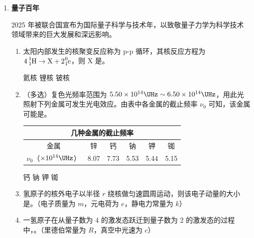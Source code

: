 \documentclass[\gkver]{gaokaozhenti}
\begin{document}
\begin{enumerate}
{2．根据偏振原理，偏振片 B 每转过半周透光强度从最小到最大、再到最小，可知光屏上两个光强最小的时间间隔为 $0.5T$，故选 C。

3．若从 c 侧观察，插入 c 时，应遮住 a、b；插入 d 时，应遮住 c 以及 a、b 的像；

该玻璃的折射率为 $n=\frac{\sin\theta_{1}}{\sin\theta_{2}}$。
}

\item
\textbf{量子百年}

2025 年被联合国宣布为国际量子科学与技术年，以致敬量子力学为科学技术领域带来的巨大发展和深远影响。
\begin{enumerate}
	\item
	太阳内部发生的核聚变反应称为 p-p 循环，其核反应方程为 $\ce{4^{1}_{1}H} \to \ce{X} + 2\ce{^{0}_{1}e}$，则 X 是。

	{氦核}
	{锂核}
	{铍核}

	\item
	（多选）复色光频率范围为 $5.50\times10^{14} \UHz \sim 6.50\times10^{14} \UHz$，用此光照射下列金属可发生光电效应。由表中各金属的截止频率 $\nu_{0}$ 可知，该金属可能是。

	\begin{center}
\begin{tabular}{|c|c|c|c|c|c|}
\hline
\multicolumn{6}{|c|}{几种金属的截止频率} \\ \hline
金属 & 锌 & 钙 & 钠 & 钾 & 铷 \\ \hline
$\nu_{0}$（$\times10^{14} \UHz$） & 8.07 & 7.73 & 5.53 & 5.44 & 5.15 \\ \hline
\end{tabular}
\end{center}

	{钙}
	{钠}
	{钾}
	{铷}

	\item
	氢原子的核外电子以半径 $r$ 绕核做匀速圆周运动，则该电子动量的大小是\newline{}。（电子质量为 $m$，元电荷为 $e$，静电力常量为 $k$）

	\item
	一氢原子在从量子数为 4 的激发态跃迁到量子数为 2 的激发态的过程中，。（里德伯常量为 $R$，真空中光速为 $c$）


\end{enumerate}
\end{enumerate}
\end{document}
